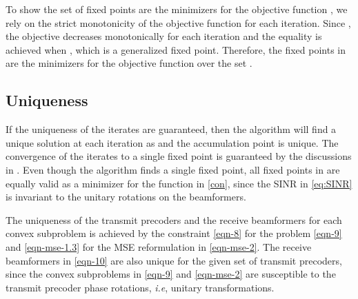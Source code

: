 To show the set of fixed points  are the minimizers for the objective function , we rely on the strict monotonicity of the objective function for each iteration. Since , the objective decreases monotonically for each iteration and the equality is achieved when , which is a generalized fixed point. Therefore, the fixed points in  are the minimizers for the objective function  over the set .

\subsection{Uniqueness}
If the uniqueness of the iterates are guaranteed, then the algorithm will find a unique solution at each iteration as  and the accumulation point is unique. The convergence of the iterates to a single fixed point is guaranteed by the discussions in \cite{zangwill1969nonlinear,meyer1976sufficient}. Even though the algorithm finds a single fixed point, all fixed points in  are equally valid as a minimizer for the function  in \eqref{con}, since the \ac{SINR} in \eqref{eq:SINR} is invariant to the unitary rotations on the beamformers.

The uniqueness of the transmit precoders and the receive beamformers for each convex subproblem is achieved by the constraint \eqref{eqn-8} for the problem \eqref{eqn-9} and \eqref{eqn-mse-1.3} for the \ac{MSE} reformulation in \eqref{eqn-mse-2}. The receive beamformers  in \eqref{eqn-10} are also unique for the given set of transmit precoders, since the convex subproblems in \eqref{eqn-9} and \eqref{eqn-mse-2} are susceptible to the transmit precoder phase rotations, \textit{i.e}, unitary transformations. 


